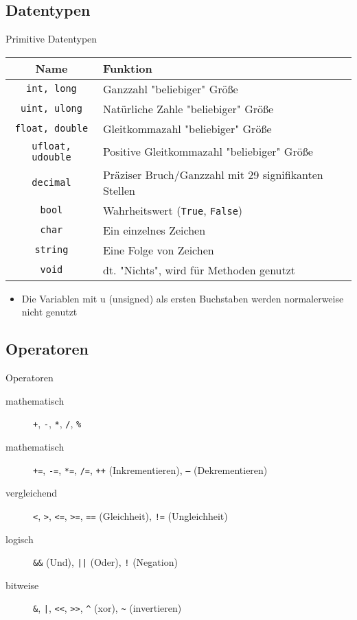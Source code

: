 \subsection{Datentypen}
\begin{frame}{Primitive Datentypen}
	\begin{tabular}{c|l}
		Name & Funktion \\ \hline
		\texttt{int, long} & Ganzzahl "beliebiger" Größe \\
		\texttt{uint, ulong} & Natürliche Zahle "beliebiger" Größe \\
		\texttt{float, double} & Gleitkommazahl "beliebiger" Größe \\
		\texttt{ufloat, udouble} & Positive Gleitkommazahl "beliebiger" Größe \\
        \texttt{decimal} & Präziser Bruch/Ganzzahl mit 29 signifikanten Stellen \\
		\texttt{bool} & Wahrheitswert (\texttt{True}, \texttt{False})\\
        \texttt{char} & Ein einzelnes Zeichen \\
		\texttt{string} & Eine Folge von Zeichen \\
		\texttt{void} & dt. "Nichts", wird für Methoden genutzt \\
	\end{tabular}
	\begin{itemize}
		 \item Die Variablen mit u (unsigned) als ersten Buchstaben werden normalerweise nicht genutzt
	\end{itemize}
\end{frame}

\subsection{Operatoren}
\begin{frame}{Operatoren}
	\begin{description}
	    \item[mathematisch] \alert{\texttt{+}}, \alert{\texttt{-}}, \alert{\texttt{*}}, \alert{\texttt{/}}, \alert{\texttt{\%}}
	    \item[mathematisch] \alert{\texttt{+=}}, \alert{\texttt{-=}}, \alert{\texttt{*=}}, \alert{\texttt{/=}}, \alert{\texttt{++}} (Inkrementieren), \alert{\texttt{--}} (Dekrementieren)
	    \item[vergleichend] \alert{\texttt{<}}, \alert{\texttt{>}}, \alert{\texttt{<=}}, \alert{\texttt{>=}}, \alert{\texttt{==}} (Gleichheit), \alert{\texttt{!=}} (Ungleichheit)
	    \item[logisch] \alert{\texttt{\&\&}} (Und), \alert{\texttt{||}} (Oder), \alert{\texttt{!}} (Negation)
	    \item[bitweise] \alert{\texttt{\&}}, \alert{\texttt{|}}, \alert{\texttt{<<}}, \alert{\texttt{>>}}, \alert{\texttt{\^}} (xor), \alert{\texttt{\~}} (invertieren)
	\end{description}
\end{frame}

